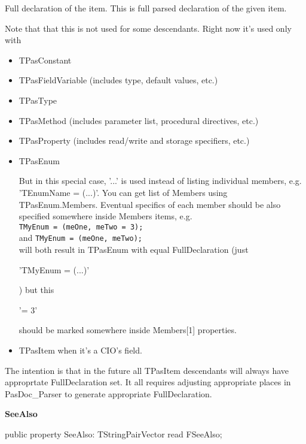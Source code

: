 \documentclass{report}
\newif\ifpdf
\begin{document}
\begin{list}{}
\begin{flushleft}
\ifpdf
\end{flushleft}
\fi


\par Full declaration of the item. This is full parsed declaration of the given item.

Note that that this is not used for some descendants. Right now it's used only with \begin{itemize}
\item TPasConstant
\item TPasFieldVariable (includes type, default values, etc.)
\item TPasType
\item TPasMethod (includes parameter list, procedural directives, etc.)
\item TPasProperty (includes read/write and storage specifiers, etc.)
\item TPasEnum

But in this special case, '...' is used instead of listing individual members, e.g. 'TEnumName = (...)'. You can get list of Members using TPasEnum.Members. Eventual specifics of each member should be also specified somewhere inside Members items, e.g. \texttt{TMyEnum~=~(meOne,~meTwo~=~3);\\
} and \texttt{TMyEnum~=~(meOne,~meTwo);\\
} will both result in TPasEnum with equal FullDeclaration (just \begin{ttfamily}'TMyEnum = (...)'\end{ttfamily}) but this \begin{ttfamily}'= 3'\end{ttfamily} should be marked somewhere inside Members[1] properties.
\item TPasItem when it's a CIO's field.
\end{itemize}

The intention is that in the future all TPasItem descendants will always have approprtate FullDeclaration set. It all requires adjusting appropriate places in PasDoc{\_}Parser to generate appropriate FullDeclaration.\label{PasDoc_Items.TPasItem-SeeAlso}
\item[\textbf{SeeAlso}\hfill]
\ifpdf
\begin{flushleft}
\fi
\begin{ttfamily}
public property SeeAlso: TStringPairVector read FSeeAlso;\end{ttfamily}

\ifpdf
\end{flushleft}
\fi



\end{list}
\end{document}
